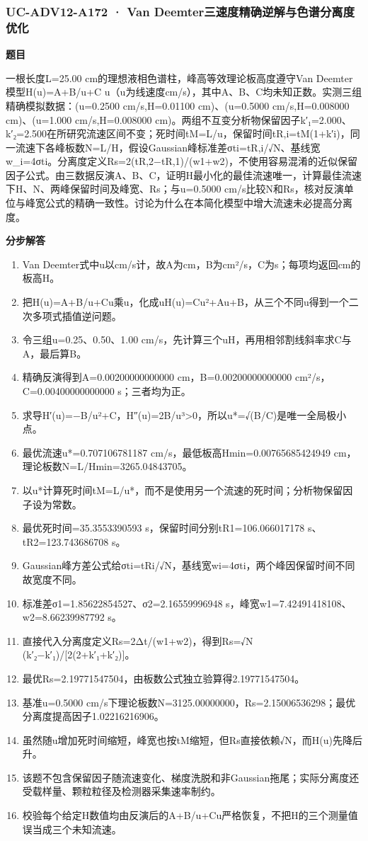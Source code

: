\documentclass[UTF8,11pt,a4paper]{ctexart}
\begin{document}
\subsubsection*{UC-ADV12-A172 · Van Deemter三速度精确逆解与色谱分离度优化}
\noindent\textbf{题目}\par
一根长度L=25.00 cm的理想液相色谱柱，峰高等效理论板高度遵守Van Deemter模型H(u)=A+B/u+C u（u为线速度cm/s），其中A、B、C均未知正数。实测三组精确模拟数据：(u=0.2500 cm/s,H=0.01100 cm)、(u=0.5000 cm/s,H=0.008000 cm)、(u=1.000 cm/s,H=0.008000 cm)。两组不互变分析物保留因子k′₁=2.000、k′₂=2.500在所研究流速区间不变；死时间tM=L/u，保留时间tR,i=tM(1+k′i)，同一流速下各峰板数N=L/H，假设Gaussian峰标准差σti=tR,i/√N、基线宽w\_i=4σti。分离度定义Rs=2(tR,2−tR,1)/(w1+w2)，不使用容易混淆的近似保留因子公式。由三数据反演A、B、C，证明H最小化的最佳流速唯一，计算最佳流速下H、N、两峰保留时间及峰宽、Rs；与u=0.5000 cm/s比较N和Rs，核对反演单位与峰宽公式的精确一致性。讨论为什么在本简化模型中增大流速未必提高分离度。\par
\medskip\noindent\textbf{分步解答}
\begin{enumerate}
\item Van Deemter式中u以cm/s计，故A为cm，B为cm²/s，C为s；每项均返回cm的板高H。
\item 把H(u)=A+B/u+Cu乘u，化成uH(u)=Cu²+Au+B，从三个不同u得到一个二次多项式插值逆问题。
\item 令三组u=0.25、0.50、1.00 cm/s，先计算三个uH，再用相邻割线斜率求C与A，最后算B。
\item 精确反演得到A=0.00200000000000 cm，B=0.00200000000000 cm²/s，C=0.00400000000000 s；三者均为正。
\item 求导H′(u)=−B/u²+C，H″(u)=2B/u³>0，所以u*=√(B/C)是唯一全局极小点。
\item 最优流速u*=0.707106781187 cm/s，最低板高Hmin=0.00765685424949 cm，理论板数N=L/Hmin=3265.04843705。
\item 以u*计算死时间tM=L/u*，而不是使用另一个流速的死时间；分析物保留因子设为常数。
\item 最优死时间=35.3553390593 s，保留时间分别tR1=106.066017178 s、tR2=123.743686708 s。
\item Gaussian峰方差公式给σti=tRi/√N，基线宽wi=4σti，两个峰因保留时间不同故宽度不同。
\item 标准差σ1=1.85622854527、σ2=2.16559996948 s，峰宽w1=7.42491418108、w2=8.66239987792 s。
\item 直接代入分离度定义Rs=2Δt/(w1+w2)，得到Rs=√N (k′₂−k′₁)/[2(2+k′₁+k′₂)]。
\item 最优Rs=2.19771547504，由板数公式独立验算得2.19771547504。
\item 基准u=0.5000 cm/s下理论板数N=3125.00000000，Rs=2.15006536298；最优分离度提高因子1.02216216906。
\item 虽然随u增加死时间缩短，峰宽也按tM缩短，但Rs直接依赖√N，而H(u)先降后升。
\item 该题不包含保留因子随流速变化、梯度洗脱和非Gaussian拖尾；实际分离度还受载样量、颗粒粒径及检测器采集速率制约。
\item 校验每个给定H数值均由反演后的A+B/u+Cu严格恢复，不把H的三个测量值误当成三个未知流速。
\end{enumerate}
\end{document}
